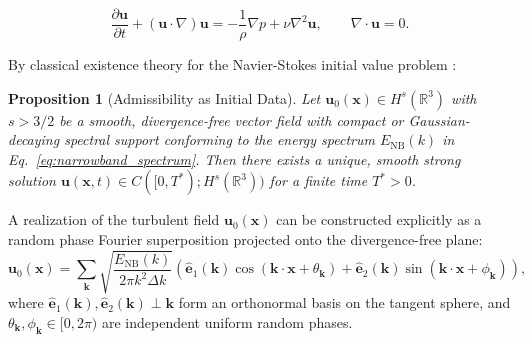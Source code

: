 \documentclass[lineno]{jfm}
\newtheorem{proposition}[theorem]{Proposition}
\begin{document}
\begin{equation}
\frac{\partial \mathbf{u}}{\partial t} + (\mathbf{u} \cdot \nabla)\mathbf{u} = -\frac{1}{\rho}\nabla p + \nu \nabla^2 \mathbf{u}, \qquad \nabla \cdot \mathbf{u} = 0.
\label{eq:navier_stokes}
\end{equation}

By classical existence theory for the Navier-Stokes initial value problem \citep{Leray1934, FujitaKato1964}:
\begin{proposition}[Admissibility as Initial Data]
Let $\mathbf{u}_0(\mathbf{x}) \in H^s(\mathbb{R}^3)$ with $s > 3/2$ be a smooth, divergence-free vector field with compact or Gaussian-decaying spectral support conforming to the energy spectrum $E_{\text{NB}}(k)$ in Eq.~\eqref{eq:narrowband_spectrum}. Then there exists a unique, smooth strong solution $\mathbf{u}(\mathbf{x}, t) \in C([0, T^*); H^s(\mathbb{R}^3))$ for a finite time $T^* > 0$.
\end{proposition}

A realization of the turbulent field $\mathbf{u}_0(\mathbf{x})$ can be constructed explicitly as a random phase Fourier superposition projected onto the divergence-free plane:
\begin{equation}
\mathbf{u}_0(\mathbf{x}) = \sum_{\mathbf{k}} \sqrt{\frac{E_{\text{NB}}(k)}{2\pi k^2 \Delta k}} \left( \hat{\mathbf{e}}_1(\mathbf{k})\cos(\mathbf{k} \cdot \mathbf{x} + \theta_{\mathbf{k}}) + \hat{\mathbf{e}}_2(\mathbf{k})\sin(\mathbf{k} \cdot \mathbf{x} + \phi_{\mathbf{k}}) \right),
\label{eq:fourier_realization}
\end{equation}
where $\hat{\mathbf{e}}_1(\mathbf{k}), \hat{\mathbf{e}}_2(\mathbf{k}) \perp \mathbf{k}$ form an orthonormal basis on the tangent sphere, and $\theta_{\mathbf{k}}, \phi_{\mathbf{k}} \in [0, 2\pi)$ are independent uniform random phases. 
\end{document}
